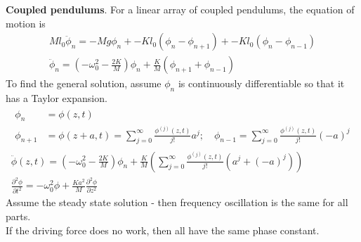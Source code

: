 \documentclass[twoside,10pt]{amsart}
\newcommand{\problemhead}[1]
  {\smallskip
   \noindent{\large\bf Problem #1.}
   \smallskip}
\begin{document}
\problemhead{3.30} \textbf{Coupled pendulums}.  For a linear array of coupled pendulums, the equation of motion is
\[
\begin{gathered}
  M l_0 \ddot{\phi}_n = -Mg \phi_n + -Kl_0 (\phi_n - \phi_{n+1}) + -Kl_0 (\phi_n -\phi_{n-1}) \\
  \ddot{\phi}_n = (-\omega_0^2 - \frac{2K}{M})\phi_n + \frac{K}{M} (\phi_{n+1} + \phi_{n-1} )
\end{gathered}
\]
To find the general solution, assume $\phi_n$ is continuously differentiable so that it has a Taylor expansion.  
\[
\begin{gathered}
  \begin{aligned}
    \phi_n & = \phi(z,t) \\
    \phi_{n+1} & = \phi(z+a,t) = \sum_{j=0}^{\infty} \frac{ \phi^{(j)}(z,t) }{j! } a^j ; \quad \phi_{n-1} = \sum_{j=0}^{\infty} \frac{ \phi^{(j)}(z,t) }{j! } (-a)^j 
\end{aligned} \\
  \ddot{\phi}(z,t) = (-\omega_0^2 - \frac{2K}{M} ) \phi_n + \frac{K}{M} \left( \sum_{j=0}^{\infty} \frac{ \phi^{(j)}(z,t) }{j!} (a^j + (-a)^j ) \right) \\
  \frac{ \partial^2 \phi}{ \partial t^2 } = -\omega_0^2 \phi + \frac{Ka^2}{M} \frac{ \partial^2 \phi}{ \partial z^2 }
\end{gathered}
\]
Assume the steady state solution - then frequency oscillation is the same for all parts.  \\
If the driving force does no work, then all have the same phase constant. 
\end{document}
